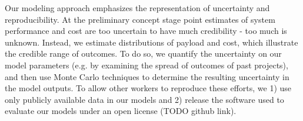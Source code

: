 \documentclass[conf]{new-aiaa}
\begin{document}
Our modeling approach emphasizes the representation of uncertainty and reproducibility. At the preliminary concept stage point estimates of system performance and cost are too uncertain to have much credibility - too much is unknown. Instead, we estimate distributions of payload and cost, which illustrate the credible range of outcomes. To do so, we quantify the uncertainty on our model parameters (e.g. by examining the spread of outcomes of past projects), and then use Monte Carlo techniques to determine the resulting uncertainty in the model outputs. To allow other workers to reproduce these efforts, we 1) use only publicly available data in our models and 2) release the software used to evaluate our models under an open license (TODO github link).



\end{document}
